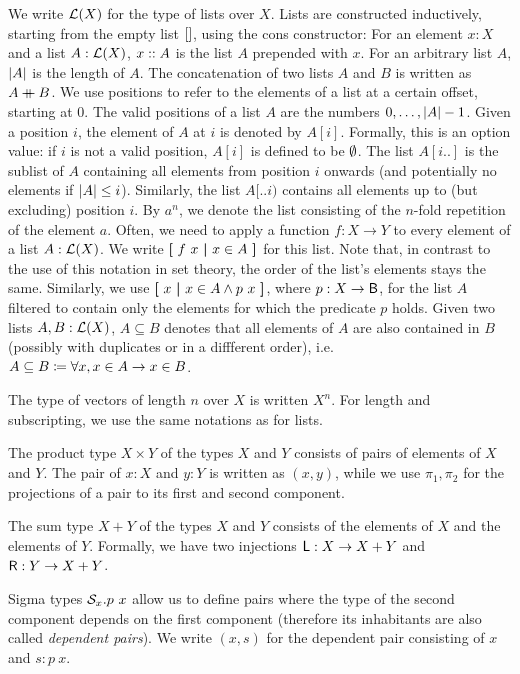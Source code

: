 We write $\mathcal{L} (X)$ for the type of lists over $X$. Lists are constructed inductively, starting from the empty list $[]$, using the cons constructor: For an element $x : X$ and a list $A : \mathcal{L} (X)$, $x::{} A$ is the list $A$ prepended with $x$.
For an arbitrary list $A$, $|A|$ is the length of $A$. 
The concatenation of two lists $A$ and $B$ is written as $A \mathbin{+\mkern-10mu+}{} B$. 
We use positions to refer to the elements of a list at a certain offset, starting at 0. The valid positions of a list $A$ are the numbers $0, \ldots, |A|-1$. 
Given a position $i$, the element of $A$ at $i$ is denoted by $A[i]$. Formally, this is an option value: if $i$ is not a valid position, $A[i]$ is defined to be $\emptyset{}$. 
The list $A[i..]$ is the sublist of $A$ containing all elements from position $i$ onwards (and potentially no elements if $|A| \le i$). Similarly, the list $A[..i)$ contains all elements up to (but excluding) position $i$. 
By $a^n$, we denote the list consisting of the $n$-fold repetition of the element $a$.
Often, we need to apply a function $f : X \rightarrow Y$ to every element of a list $A : \mathcal{L} (X)$. We write $\textbf{[}~ f~x ~\textbf{|}~ x \in A ~\textbf{]}$ for this list. Note that, in contrast to the use of this notation in set theory, the order of the list's elements stays the same. 
Similarly, we use $\textbf{[}~ x ~\textbf{|}~ x \in A \land p~x ~\textbf{]}$, where $p : X \rightarrow \textsf{B}$, for the list $A$ filtered to contain only the elements for which the predicate $p$ holds.
Given two lists $A, B : \mathcal{L} (X)$, $A \subseteq B$ denotes that all elements of $A$ are also contained in $B$ (possibly with duplicates or in a diffferent order), i.e.\ $A \subseteq B \coloneqq \forall x, x \in A \rightarrow x \in B$. 

The type of vectors of length $n$ over $X$ is written $X^n$. For length and subscripting, we use the same notations as for lists.

The product type $X \times Y$ of the types $X$ and $Y$ consists of pairs of elements of $X$ and $Y$. The pair of $x : X$ and $y : Y$ is written as $(x, y)$, while we use $\pi_1, \pi_2$ for the projections of a pair to its first and second component. 

The sum type $X + Y$ of the types $X$ and $Y$ consists of the elements of $X$ and the elements of $Y$. Formally, we have two injections $\textsf{L} : X \rightarrow X + Y$ and $\textsf{R} : Y \rightarrow X + Y$. 

Sigma types $\mathcal{S}_{x}.p~x$ allow us to define pairs where the type of the second component depends on the first component (therefore its inhabitants are also called \emph{dependent pairs}). We write $(x, s)$ for the dependent pair consisting of $x$ and $s : p~x$. 

